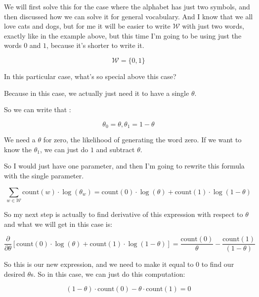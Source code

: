 \documentclass[a4paper, 12pt]{article}
\begin{document}
We will first solve this for the case where the alphabet has just two symbols,
and then discussed how we can solve it for general vocabulary. And I know that
we all love cats and dogs, but for me it will be easier to write \(\mathcal{W}\)
with just two words, exactly like in the example above, but this time I'm going
to be using just the words \(0\) and \(1\), because it's shorter to write it.

\begin{equation}
\mathcal{W}=\{0, 1\}
\end{equation}

In this particular case, what's so special above this case?

Because in this case, we actually just need it to have a single \(\theta\).

So we can write that :

\begin{equation}
\theta_0=\theta, \theta_1=1-\theta
\end{equation}

We need a \(\theta\) for zero, the likelihood of generating the word zero. If we want
to know the \(\theta_1\), we can just do \(1\) and subtract \(\theta\).

So I would just have one parameter, and then I'm going to rewrite this formula
with the single parameter.

\begin{equation}
\sum_{w \in \mathcal{W}} \text{count}(w) \cdot \log(\theta_{w})=\text{count}(0) \cdot \log(\theta)+\text{count}(1) \cdot \log(1-\theta)
\end{equation}

So my next step is actually to find derivative of this expression with respect
to \(\theta\) and what we will get in this case is:

\begin{equation}
\frac{\partial}{\partial \theta} [\text{count}(0) \cdot \log(\theta)+\text{count}(1)\cdot \log(1-\theta)]=\frac{\text{count}(0)}{\theta}-\frac{\text{count}(1)}{(1-\theta)}
\end{equation}

So this is our new expression, and we need to make it equal to \(0\) to find our
desired \(\theta\)s. So in this case, we can just do this computation:

\begin{equation}
(1-\theta)\cdot \text{count}(0) - \theta \cdot \text{count}(1) = 0
\end{equation}
\end{document}
